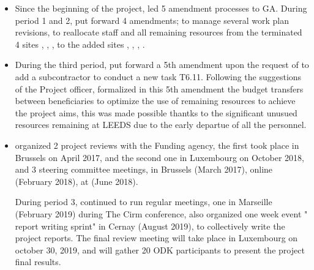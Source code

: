 \begin{itemize}
\item %

Since the beginning of the project,  led  5 amendment processes to GA. 
During period 1 and 2,  put forward 4 amendments; to manage several work 
plan revisions,  to reallocate staff and all remaining resources from the terminated 4 sites
 , , ,  to the added  sites , 
, , .
\item During the third period,  put forward a 5th amendment upon the request of 
to add a subcontractor to conduct a new task T6.11. Following the suggestions 
of the Project officer,  formalized in this 5th amendment the budget transfers
between beneficiaries to optimize the use of remaining resources to achieve the project 
aims, this was made possible thantks to the significant unusued resources remaining at 
LEEDS due to the early departue of all the personnel. 

\item {} organized 2 project reviews with the Funding agency, 
the first took place in Brussels on April 2017, and the second one in Luxembourg 
on October 2018, and 3 steering committee meetings, in Brussels (March 2017), online
  (February 2018),  at  (June 2018).
  
  During period 3,  continued to run regular meetings, one in Marseille 
(February 2019) during The Cirm conference,  also organized one week event " report writing sprint" 
in Cernay (August 2019), to collectively write the project reports.  The final review meeting 
will take place in Luxembourg on october 30, 2019, and will gather 20 ODK participants to present 
the project final results. 


\end{itemize}
